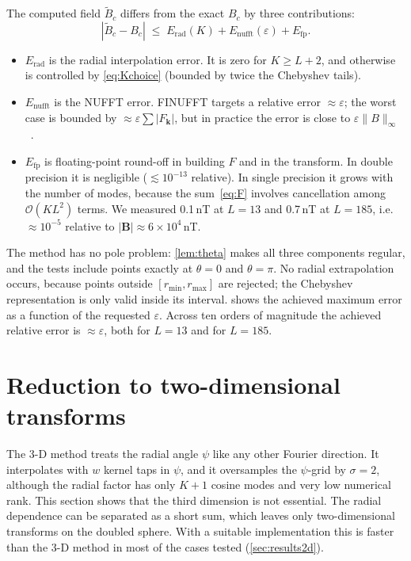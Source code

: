 \documentclass[11pt,a4paper]{article}
\theoremstyle{remark}
\newcommand{\eps}{\varepsilon}
\newcommand{\Oh}{\mathcal{O}}
\begin{document}
The computed field $\tilde B_c$ differs from the exact $B_c$ by three contributions:
\begin{equation}
|\tilde B_c-B_c|\;\le\;E_{\text{rad}}(K)+E_{\text{nufft}}(\eps)+E_{\text{fp}}.
\end{equation}
\begin{itemize}
\item $E_{\text{rad}}$ is the radial interpolation error. It is zero for $K\ge L+2$, and otherwise is
  controlled by \eqref{eq:Kchoice} (bounded by twice the Chebyshev tails).
\item $E_{\text{nufft}}$ is the NUFFT error. FINUFFT targets a relative error $\approx\eps$; the worst case
  is bounded by $\approx\eps\sum|F_{\mathbf k}|$, but in practice the error is close to $\eps\|B\|_\infty$~\cite{barnett2019}.
\item $E_{\text{fp}}$ is floating-point round-off in building $F$ and in the transform. In double precision it is
  negligible ($\lesssim10^{-13}$ relative). In single precision it grows with the number of modes,
  because the sum~\eqref{eq:F} involves cancellation among $\Oh(KL^2)$ terms. We measured 0.1\,nT
  at $L=13$ and 0.7\,nT at $L=185$, i.e.\ $\approx10^{-5}$ relative to $|\mathbf B|\approx6\times10^4$\,nT.
\end{itemize}
The method has no pole problem: \cref{lem:theta} makes all three components regular, and
the tests include points exactly at $\theta=0$ and $\theta=\pi$. No radial extrapolation occurs, because
points outside $[r_{\min},r_{\max}]$ are rejected; the Chebyshev representation is only valid
inside its interval.  shows the achieved maximum error as a function of
the requested $\eps$. Across ten orders of magnitude the achieved relative error is
$\approx\eps$, both for $L=13$ and for $L=185$.

\section{Reduction to two-dimensional transforms}\label{sec:2d}

The 3-D method treats the radial angle $\psi$ like any other Fourier direction. It interpolates with
$w$ kernel taps in $\psi$, and it oversamples the $\psi$-grid by $\sigma=2$, although the radial
factor has only $K+1$ cosine modes and very low numerical rank. This section shows that the third
dimension is not essential. The radial dependence can be separated as a short sum, which leaves
only two-dimensional transforms on the doubled sphere. With a suitable implementation this is
faster than the 3-D method in most of the cases tested (\cref{sec:results2d}).
\end{document}

